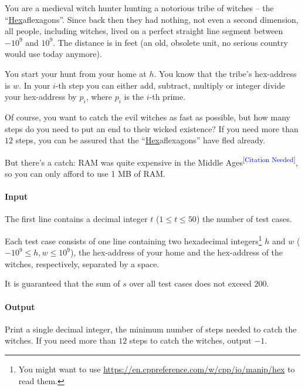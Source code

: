 



\makeheader

You are a medieval witch hunter hunting a notorious tribe of witches -- the “\underline{Hex}aflexagons”.
Since back then they had nothing, not even a second dimension, all people, including witches, lived
on a perfect straight line segment between $-10^9$ and $10^9$. The distance is in feet (an old, obsolete unit,
no serious country would use today anymore).

You start your hunt from your home at $h$. You know that the tribe's hex-address is $w$.
In your $i$-th step you can either add, subtract, multiply or integer divide your hex-address by $p_i$,
where $p_i$ is the $i$-th prime.

Of course, you want to catch the evil witches as fast as possible, but
how many steps do you need to put an end to their wicked existence?
If you need more than $12$ steps, you can be assured that
the “\underline{Hex}aflexagons” have fled already.

But there's a catch:
RAM was quite expensive in the Middle Ages\textsuperscript{[\textcolor{blue}{Citation Needed}]},
so you can only afford to use 1 MB of RAM.

\paragraph*{Input}

The first line contains a decimal integer $t$ ($1\leq t\leq 50$) the number of test cases.

Each test case consists of one line containing two hexadecimal integers\footnote{You might want to use \url{https://en.cppreference.com/w/cpp/io/manip/hex} to read them.}
$h$ and $w$ ($-10^9 \leq h, w \leq 10^9$), the hex-address of your home and the hex-address of the witches, respectively, separated by a space.

It is guaranteed that the sum of $s$ over all test cases does not exceed $200$.

\paragraph*{Output}

Print a single decimal integer, the minimum number of steps needed to catch the witches.
If you need more than $12$ steps to catch the witches, output $-1$.

\begin{samples}
\end{samples}

